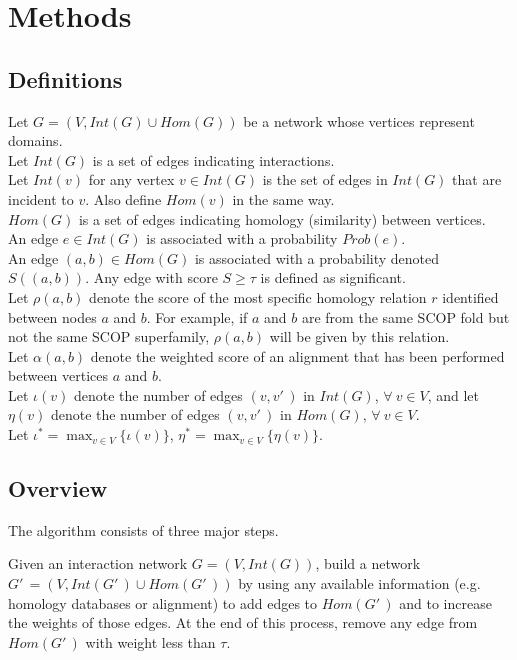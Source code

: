 \documentclass[12pt,twoside]{article}
\def\NI{\noindent}
\begin{document}
\section{Methods}

\subsection{Definitions}

Let $G = (V,Int(G) \cup Hom(G))$ be a network whose vertices represent domains.\\
Let $Int(G)$ is a set of edges indicating interactions.\\
Let $Int(v)$ for any vertex $v \in Int(G)$ is the set of edges in $Int(G)$ that are incident to $v$. Also define $Hom(v)$ in the same way.\\
$Hom(G)$ is a set of edges indicating homology (similarity) between vertices.\\
An edge $e \in Int(G)$ is associated with a probability $Prob(e)$.\\
An edge $(a,b) \in Hom(G)$ is associated with a probability denoted $S((a,b))$. Any edge with score $S \geq \tau$ is defined as significant.\\
Let $\rho(a,b)$ denote the score of the most specific homology relation $r$ identified between nodes $a$ and $b$. For example, if $a$ and $b$ are from the same SCOP fold but not the same SCOP superfamily, $\rho(a,b)$ will be given by this relation.\\
Let $\alpha(a,b)$ denote the weighted score of an alignment that has been performed between vertices $a$ and $b$.\\
Let $\iota(v)$ denote the number of edges $(v, v'\,\!)$ in $Int(G)$, $\forall \: v \in V$, and let $\eta(v)$ denote the number of edges $(v, v'\,\!)$ in $Hom(G)$, $\forall \: v \in V$.\\
Let $\iota^* = \displaystyle \max_{v \in V}\{\iota(v)\}$, $\eta^* = \displaystyle \max_{v \in V}\{\eta(v)\}$.
\subsection{Overview}

The algorithm consists of three major steps.

\NI Given an interaction network $G=(V,Int(G))$, build a network $G'\,\! = (V,Int(G'\,\!) \cup Hom(G'\,\!))$ by using any available information (e.g. homology databases or alignment) to add edges to $Hom(G'\,\!)$ and to increase the weights of those edges. At the end of this process, remove any edge from $Hom(G'\,\!)$ with  weight less than $\tau$.
\end{document}

